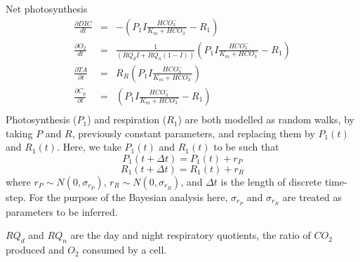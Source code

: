 \documentclass{ruthesis}
\begin{document}
Net photosynthesis
\begin{align}
\frac{\partial DIC}{dt} &=&  -(P_1 I \frac{HCO_3^-}{K_m + HCO_3^-}  - R_1) 
\\
\frac{\partial O_2}{dt}	&=&  \frac{1}{(RQ_d I + RQ_n(1-I))}(P_1 I \frac{HCO_3^-}{K_m + HCO_3^-}  - R_1)
\\
\frac{\partial TA}{\partial t}  &=&      R_R (P_1 I \frac{HCO_3^-}{K_m + HCO_3^-})
\\
\frac{\partial C_p}{\partial t} &=& (P_1 I \frac{HCO_3^-}{K_m + HCO_3^-} - R_1) 
\\\nonumber
\end{align} 
Photosynthesis ($P_1$) and respiration ($R_1$) are both modelled as random walks, by taking \begin{math}P\end{math} and \begin{math}R\end{math}, previously constant parameters, and replacing them by \begin{math}P_1(t)\end{math} and \begin{math}R_1(t)\end{math}. Here, we take \begin{math}P_1(t)\end{math} and \begin{math}R_1(t)\end{math} to be such that
\begin{displaymath}
P_1(t+\Delta t) = P_1(t) + r_P
\end{displaymath}
\begin{displaymath}
R_1(t+\Delta t) = R_1(t) + r_R
\end{displaymath}
where \begin{math}
r_P \sim N(0, \sigma_{r_P})
\end{math}, \begin{math}
r_R \sim N(0, \sigma_{r_R})
\end{math}, and \begin{math}
\Delta t
\end{math} is the length of discrete time-step. For the purpose of the Bayesian analysis here, \begin{math}\sigma_{r_P}\end{math} and \begin{math}\sigma_{r_R}\end{math} are treated as parameters to be inferred. 


$RQ_d$ and $RQ_n$ are the day and night respiratory quotients, the ratio of $CO_2$ produced and $O_2$ consumed by a cell. 
\end{document}
